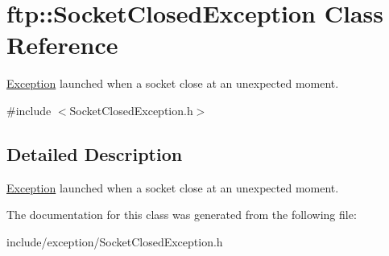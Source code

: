 \hypertarget{classftp_1_1_socket_closed_exception}{\section{ftp\-:\-:Socket\-Closed\-Exception Class Reference}
\label{classftp_1_1_socket_closed_exception}
}


\hyperlink{classftp_1_1_exception}{Exception} launched when a socket close at an unexpected moment.  




{\ttfamily \#include $<$Socket\-Closed\-Exception.\-h$>$}



\subsection{Detailed Description}
\hyperlink{classftp_1_1_exception}{Exception} launched when a socket close at an unexpected moment. 

The documentation for this class was generated from the following file\-:\begin{DoxyCompactItemize}
\item 
include/exception/Socket\-Closed\-Exception.\-h\end{DoxyCompactItemize}
